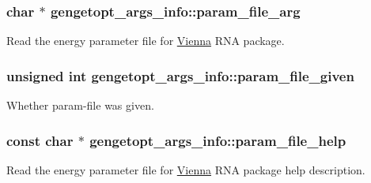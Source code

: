 \hypertarget{structgengetopt__args__info_aa68408ac76065d32115a6517d1dc084f}{
\subsubsection[{param\+\_\+file\+\_\+arg}]{\setlength{\rightskip}{0pt plus 5cm}char $\ast$ gengetopt\+\_\+args\+\_\+info\+::param\+\_\+file\+\_\+arg}}\label{structgengetopt__args__info_aa68408ac76065d32115a6517d1dc084f}


Read the energy parameter file for \hyperlink{namespace_vienna}{Vienna} R\+N\+A package. 

\hypertarget{structgengetopt__args__info_acb50657bd03e25460c0fc7b2eda21c3a}{
\subsubsection[{param\+\_\+file\+\_\+given}]{\setlength{\rightskip}{0pt plus 5cm}unsigned int gengetopt\+\_\+args\+\_\+info\+::param\+\_\+file\+\_\+given}}\label{structgengetopt__args__info_acb50657bd03e25460c0fc7b2eda21c3a}


Whether param-\/file was given. 

\hypertarget{structgengetopt__args__info_a9f45df949ae710b164262b66c4982498}{
\subsubsection[{param\+\_\+file\+\_\+help}]{\setlength{\rightskip}{0pt plus 5cm}const char $\ast$ gengetopt\+\_\+args\+\_\+info\+::param\+\_\+file\+\_\+help}}\label{structgengetopt__args__info_a9f45df949ae710b164262b66c4982498}


Read the energy parameter file for \hyperlink{namespace_vienna}{Vienna} R\+N\+A package help description. 

